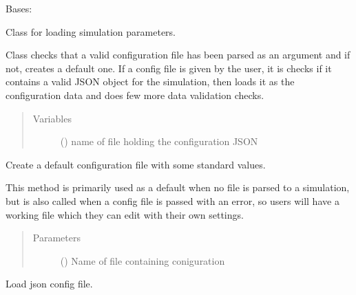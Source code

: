 \documentclass[letterpaper,10pt,english]{sphinxmanual}
\begin{document}
\begin{fulllineitems}
\label{\detokenize{pumha:pumha.pop.Configuration}}
Bases: 

Class for loading simulation parameters.

Class checks that a valid configuration file has been parsed as an
argument and if not, creates a default one. If a config file is given by
the user, it is checks if it contains a valid JSON object for the
simulation, then loads it as the configuration data and does few more data
validation checks.
\begin{quote}\begin{description}
\item[{Variables}] \leavevmode
{} () \textendash{} name of file holding the configuration JSON

\end{description}\end{quote}

\begin{fulllineitems}
\label{\detokenize{pumha:pumha.pop.Configuration.create_config}}
Create a default configuration file with some standard values.

This method is primarily used as a default when no file
is parsed to a simulation, but is also called when a config
file is passed with an error, so users will have a working
file which they can edit with their own settings.
\begin{quote}\begin{description}
\item[{Parameters}] \leavevmode
{} () \textendash{} Name of file containing coniguration

\end{description}\end{quote}

\end{fulllineitems}


\begin{fulllineitems}
\label{\detokenize{pumha:pumha.pop.Configuration.load_from_file}}
Load json config file.


\end{fulllineitems}
\end{fulllineitems}
\end{document}
